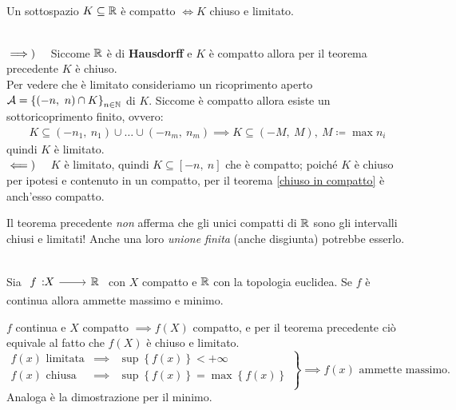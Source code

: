 \begin{theorema}~{}\label{compatto chiuso e limitato R}\\
Un sottospazio $K\subseteq \mathbb{R}$ è compatto $\iff K$ chiuso e limitato.
\end{theorema}
\begin{demonstration}~{}\\
	$\implies)\quad$ Siccome $\mathbb{R}$ è di \textbf{Hausdorff} e $K$ è compatto allora per il teorema precedente $K$ è chiuso.\\
	Per vedere che è limitato consideriamo un ricoprimento aperto $\mathcal{A}=\left\{ (-n,\ n)\cap K\right\}_{n\in\mathbb{N}}$ di $K$. Siccome è compatto allora esiste un sottoricoprimento finito, ovvero:
	\begin{gather*}
		K\subseteq (-n_1,\ n_1)\cup\ldots\cup(-n_m,\ n_m) \implies K\subseteq (-M,\ M), \ M\coloneqq \max n_i
	\end{gather*}
	quindi $K$ è limitato. \\
	$\impliedby)\quad $ $K$ è limitato, quindi $K\subseteq [-n, \ n]$ che è compatto; poiché $K$ è chiuso per ipotesi e contenuto in un compatto, per il teorema \ref{chiuso in compatto} è anch'esso compatto.
\end{demonstration}
\begin{attention}
	Il teorema precedente \textit{non} afferma che gli unici compatti di $\mathbb{R}$ sono gli intervalli chiusi e limitati! Anche una loro \textit{unione finita} (anche disgiunta) potrebbe esserlo.
\end{attention}
\begin{theorema}~{}\label{weierstrass}\\
Sia $\funz f X \realset$ con $X$ compatto e $\mathbb{R}$ con la topologia euclidea. Se $f$ è continua allora ammette massimo e minimo.
\end{theorema}
\begin{demonstration}
	$f$ continua e $X$ compatto $\implies f(X)$ compatto, e per il teorema precedente ciò equivale al fatto che $f(X)$ è chiuso e limitato.
	\begin{equation*}
		\left.
		\begin{array}{lcl}
			f\left(x\right)\text{ limitata}&\implies& \sup \left\{f\left(x\right)\right\}<+\infty\\
			f\left(x\right)\text{ chiusa}&\implies& \sup \left\{f\left(x\right)\right\}=\max \left\{f\left(x\right)\right\}\\
		\end{array}
		\right\}
		\implies f\left(x\right)\text{ ammette massimo.}
	\end{equation*}
	Analoga è la dimostrazione per il minimo.
\end{demonstration}

